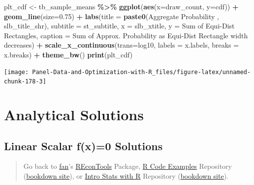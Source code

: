 \documentclass[
]{book}
\newenvironment{Shaded}{\begin{snugshade}}{\end{snugshade}}
\newcommand{\DataTypeTok}[1]{\textcolor[rgb]{0.13,0.29,0.53}{#1}}
\newcommand{\FloatTok}[1]{\textcolor[rgb]{0.00,0.00,0.81}{#1}}
\newcommand{\KeywordTok}[1]{\textcolor[rgb]{0.13,0.29,0.53}{\textbf{#1}}}
\newcommand{\NormalTok}[1]{#1}
\newcommand{\OperatorTok}[1]{\textcolor[rgb]{0.81,0.36,0.00}{\textbf{#1}}}
\newcommand{\StringTok}[1]{\textcolor[rgb]{0.31,0.60,0.02}{#1}}
\begin{document}
\begin{Shaded}
\begin{Highlighting}[]
\NormalTok{plt\_cdf \textless{}{-}}\StringTok{ }\NormalTok{tb\_sample\_means }\OperatorTok{\%\textgreater{}\%}
\StringTok{  }\KeywordTok{ggplot}\NormalTok{(}\KeywordTok{aes}\NormalTok{(}\DataTypeTok{x=}\NormalTok{draw\_count, }\DataTypeTok{y=}\NormalTok{cdf)) }\OperatorTok{+}
\StringTok{  }\KeywordTok{geom\_line}\NormalTok{(}\DataTypeTok{size=}\FloatTok{0.75}\NormalTok{) }\OperatorTok{+}
\StringTok{  }\KeywordTok{labs}\NormalTok{(}\DataTypeTok{title =} \KeywordTok{paste0}\NormalTok{(}\StringTok{\textquotesingle{}Aggregate Probability \textquotesingle{}}\NormalTok{, slb\_title\_shr),}
       \DataTypeTok{subtitle =}\NormalTok{ st\_subtitle,}
       \DataTypeTok{x =}\NormalTok{ slb\_xtitle,}
       \DataTypeTok{y =} \StringTok{\textquotesingle{}Sum of Equi{-}Dist Rectangles\textquotesingle{}}\NormalTok{,}
       \DataTypeTok{caption =} \StringTok{\textquotesingle{}Sum of Approx. Probability as Equi{-}Dist Rectangle width decreases\textquotesingle{}}\NormalTok{) }\OperatorTok{+}
\StringTok{  }\KeywordTok{scale\_x\_continuous}\NormalTok{(}\DataTypeTok{trans=}\StringTok{\textquotesingle{}log10\textquotesingle{}}\NormalTok{, }\DataTypeTok{labels =}\NormalTok{ x.labels, }\DataTypeTok{breaks =}\NormalTok{ x.breaks) }\OperatorTok{+}
\StringTok{  }\KeywordTok{theme\_bw}\NormalTok{()}
\KeywordTok{print}\NormalTok{(plt\_cdf)}
\end{Highlighting}
\end{Shaded}

\begin{center}\texttt{[image: Panel-Data-and-Optimization-with-R\_files/figure-latex/unnamed-chunk-178-3]} \end{center}

\hypertarget{analytical-solutions}{%
\section{Analytical Solutions}\label{analytical-solutions}}

\hypertarget{linear-scalar-fx0-solutions}{%
\subsection{Linear Scalar f(x)=0 Solutions}\label{linear-scalar-fx0-solutions}}

\begin{quote}
Go back to \href{http://fanwangecon.github.io/}{fan}'s \href{https://fanwangecon.github.io/REconTools/}{REconTools} Package, \href{https://fanwangecon.github.io/R4Econ/}{R Code Examples} Repository (\href{https://fanwangecon.github.io/R4Econ/bookdown}{bookdown site}), or \href{https://fanwangecon.github.io/Stat4Econ/}{Intro Stats with R} Repository (\href{https://fanwangecon.github.io/Stat4Econ/bookdown}{bookdown site}).
\end{quote}
\end{document}
